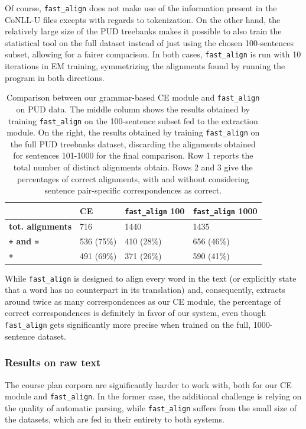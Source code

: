 \documentclass[11pt]{article}
\begin{document}
Of course, \texttt{fast\_align} does not make use of the information present in the CoNLL-U files excepts with regards to tokenization. 
On the other hand, the relatively large size of the PUD treebanks makes it possible to also train the statistical tool on the full dataset instead of just using the chosen 100-sentences subset, allowing for a fairer comparison. 
In both cases, \texttt{fast\_align} is run with 10 iterations in EM training, symmetrizing the alignments found by running the program in both directions.

\begin{table}[h]
  \centering
  \small
  \begin{tabular}{l|lll}
   & \textbf{CE} & \textbf{\texttt{fast\_align} 100} & \textbf{\texttt{fast\_align} 1000}\\ \hline
   \textbf{tot. alignments} & 716 & 1440 & 1435 \\ 
   \textbf{\texttt{+} and \texttt{=}} & 536 (75\%) & 410 (28\%) & 656 (46\%)\\ 
   \textbf{\texttt{+}} & 491 (69\%) & 371 (26\%) & 590 (41\%)\\ 
  \end{tabular}
  \caption[Comparison between our grammar-based CE module and \texttt{fast\_align}]{Comparison between our grammar-based CE module and \texttt{fast\_align} on PUD data. The middle column shows the results obtained by training \texttt{fast\_align} on the 100-sentence subset fed to the extraction module. On the right, the results obtained by training \texttt{fast\_align} on the full PUD treebanks dataset, discarding the alignments obtained for sentences 101-1000 for the final comparison. Row 1 reports the total number of distinct alignments obtain. Rows 2 and 3 give the percentages of correct alignments, with and without considering sentence pair-specific correspondences as correct.}
  \label{pud_fast}
\end{table}

While \texttt{fast\_align} is designed to align every word in the text (or explicitly state that a word has no counterpart in its translation) and, consequently, extracts around twice as many correspondences as our CE module, the percentage of correct correspondences is definitely in favor of our system, even though \texttt{fast\_align} gets significantly more precise when trained on the full, 1000-sentence dataset. 

\subsubsection{Results on raw text} \label{raw}
The course plan corpora are significantly harder to work with, both for our CE module and \texttt{fast\_align}.
In the former case, the additional challenge is relying on the quality of automatic parsing, while \texttt{fast\_align} suffers from the small size of the datasets, which are fed in their entirety to both systems.
\end{document}
